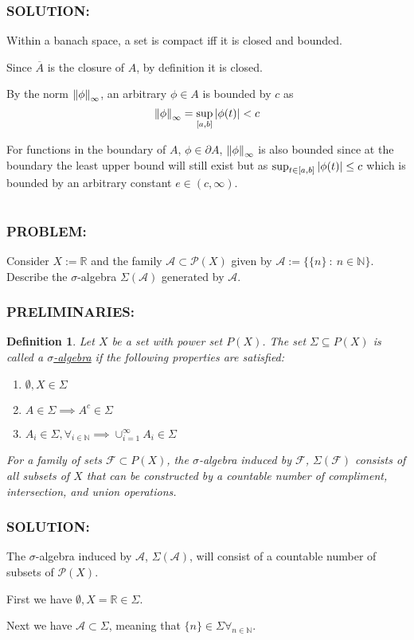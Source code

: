 \documentclass[]{article}
\newcommand{\Problem}{\subsubsection*{\textbf{PROBLEM:}}}
\newcommand{\Solution}{\subsubsection*{\textbf{SOLUTION:}}}
\newcommand{\Preliminaries}{\subsubsection*{\textbf{PRELIMINARIES:}}}
\newcommand{\N}{\mathbb{N}}
\newcommand{\R}{\mathbb{R}}
\newcommand{\st}{\ : \ }
\newtheorem{definition}{Definition}
\begin{document}
\Solution
Within a banach space, a set is compact iff it is closed and bounded.

Since $\overline{A}$ is the closure of $A$, by definition it is closed.

By the norm $\norm{\phi}_\infty$, an arbitrary $\phi \in A$ is bounded by $c$ as \[
    \norm{\phi}_\infty = \sup_{[a,b]} \abs{\phi(t)} < c
\]

For functions in the boundary of $A$, $\phi \in \partial A$, $\norm{\phi}_\infty$ is also bounded since at the boundary the least upper bound will still exist but as $\sup_{t \in [a,b]} \abs{\phi(t)} \leq c$ which is bounded by an arbitrary constant $e \in (c,\infty)$.

\newpage
\section{}
\Problem
Consider $X := \R$ and the family $\mathcal{A} \subset \mathcal{P}(X)$ given by $\mathcal{A} := \{\{n\} \st n \in \N\}$.
Describe the $\sigma$-algebra $\Sigma(\mathcal{A})$ generated by $\mathcal{A}$.

\Preliminaries
\begin{definition}
    Let $X$ be a set with power set $P(X)$. 
    The set $\Sigma \subseteq P(X)$ is called a \emph{\underline{$\sigma$-algebra}} if the following properties are satisfied:
    \begin{enumerate}
        \item $\emptyset, X \in \Sigma$
        \item $A \in \Sigma \implies A^c \in \Sigma$
        \item $A_i \in \Sigma, \forall_{i \in \N} \implies \cup_{i = 1}^{\infty} A_i \in \Sigma$
    \end{enumerate}

    For a family of sets $\mathcal{F} \subset P(X)$, the $\sigma$-algebra induced by $\mathcal{F}$, $\Sigma(\mathcal{F})$ consists of all subsets of $X$ that can be constructed by a countable number of compliment, intersection, and union operations.
\end{definition}

\Solution
The $\sigma$-algebra induced by $\mathcal{A}$, $\Sigma(\mathcal{A})$, will consist of a countable number of subsets of $\mathcal{P}(X)$.

First we have $\emptyset, X = \R \in \Sigma$.

Next we have $\mathcal{A} \subset \Sigma$, meaning that $\{n\} \in \Sigma \forall_{n \in \N}$.
\end{document}

